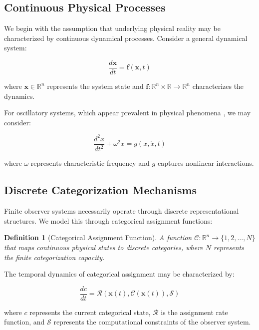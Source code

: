 \documentclass[12pt,a4paper]{article}
\newtheorem{definition}[theorem]{Definition}
\theoremstyle{remark}
\begin{document}
\subsection{Continuous Physical Processes}

We begin with the assumption that underlying physical reality may be characterized by continuous dynamical processes. Consider a general dynamical system:

\begin{equation}
\frac{d\mathbf{x}}{dt} = \mathbf{f}(\mathbf{x}, t)
\label{eq:continuous_dynamics}
\end{equation}

where $\mathbf{x} \in \mathbb{R}^n$ represents the system state and $\mathbf{f}: \mathbb{R}^n \times \mathbb{R} \to \mathbb{R}^n$ characterizes the dynamics.

For oscillatory systems, which appear prevalent in physical phenomena \cite{strogatz2014nonlinear}, we may consider:

\begin{equation}
\frac{d^2x}{dt^2} + \omega^2 x = g(x, \dot{x}, t)
\label{eq:oscillatory_dynamics}
\end{equation}

where $\omega$ represents characteristic frequency and $g$ captures nonlinear interactions.

\subsection{Discrete Categorization Mechanisms}

Finite observer systems necessarily operate through discrete representational structures. We model this through categorical assignment functions:

\begin{definition}[Categorical Assignment Function]
A function $\mathcal{C}: \mathbb{R}^n \to \{1, 2, \ldots, N\}$ that maps continuous physical states to discrete categories, where $N$ represents the finite categorization capacity.
\end{definition}

The temporal dynamics of categorical assignment may be characterized by:

\begin{equation}
\frac{dc}{dt} = \mathcal{R}(\mathbf{x}(t), \mathcal{C}(\mathbf{x}(t)), \mathcal{S})
\label{eq:categorical_rate}
\end{equation}

where $c$ represents the current categorical state, $\mathcal{R}$ is the assignment rate function, and $\mathcal{S}$ represents the computational constraints of the observer system.
\end{document}
